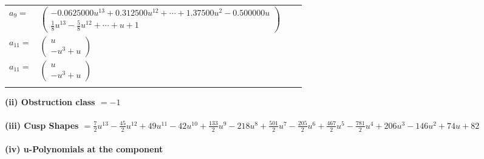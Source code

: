 \documentclass[1p]{elsarticle_modified}
\theoremstyle{definition}
\begin{document}
\begin{tabular}{m{7pt} m{180pt} m{7pt} m{180pt} }
\flushright $a_{9}=$&$\begin{pmatrix}-0.0625000 u^{13}+0.312500 u^{12}+\cdots+1.37500 u^{2}-0.500000 u\\\frac{1}{8} u^{13}-\frac{5}{8} u^{12}+\cdots+u+1\end{pmatrix}$ \\
\flushright $a_{11}=$&$\begin{pmatrix}u\\- u^3+u\end{pmatrix}$\\ \flushright $a_{11}=$&$\begin{pmatrix}u\\- u^3+u\end{pmatrix}$\\&\end{tabular}
\flushleft \textbf{(ii) Obstruction class $= -1$}\\~\\
\flushleft \textbf{(iii) Cusp Shapes $= \frac{7}{2} u^{13}-\frac{45}{2} u^{12}+49 u^{11}-42 u^{10}+\frac{133}{2} u^9-218 u^8+\frac{501}{2} u^7-\frac{205}{2} u^6+\frac{467}{2} u^5-\frac{781}{2} u^4+206 u^3-146 u^2+74 u+82$}\\~\\
\newpage\renewcommand{\arraystretch}{1}
\flushleft \textbf{(iv) u-Polynomials at the component}\newline \\
\end{document}
